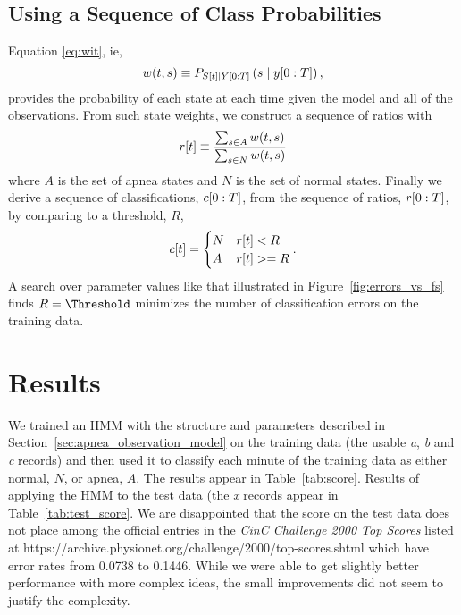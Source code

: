 \subsection{Using a Sequence of Class Probabilities}
\label{sec:prettygood}

Equation \eqref{eq:wit}, ie,
\begin{equation*}
  w(t,s) \equiv P_{{S}{[t]}\mid Y[0:T]} \left(s\mid y[0:T]
  \right),
\end{equation*}
provides the probability of each state at each time given the model and
all of the observations.  From such state weights, we construct a
sequence of ratios with
\begin{equation*}
  {r}{[t]} \equiv \frac{\sum_{s\in A} w(t,s)}{\sum_{s\in N} w(t,s)}
\end{equation*}
where $A$ is the set of apnea states and $N$ is the set of normal
states.  Finally we derive a sequence of classifications,
$c[0:T]$, from the sequence of ratios, $r[0:T]$, by
comparing to a threshold, $R$,
\begin{equation}
  \label{eq:class_sequence}
  {c}{[t]} =
  \begin{cases}
    N & {r}{[t]} < R \\
    A & {r}{[t]} >= R
  \end{cases}.
\end{equation}
A search over parameter values like that illustrated in
Figure~\ref{fig:errors_vs_fs} finds $R=\Threshold$ minimizes the number of
classification errors on the training data.

\section{Results}
\label{sec:results}

We trained an HMM with the structure and parameters described in
Section~\ref{sec:apnea_observation_model} on the training data (the
usable \emph{a}, \emph{b} and \emph{c} records) and then used it to
classify each minute of the training data as either normal, $N$, or
apnea, $A$.  The results appear in Table~\ref{tab:score}.  Results of
applying the HMM to the test data (the \emph{x} records appear in
Table~\ref{tab:test_score}.  We are disappointed that the score on the
test data does not place among the official entries in the \emph{CinC
  Challenge 2000 Top Scores} listed at
https://archive.physionet.org/challenge/2000/top-scores.shtml which
have error rates from 0.0738 to 0.1446.  While we were able to get
slightly better performance with more complex ideas, the small
improvements did not seem to justify the complexity.

